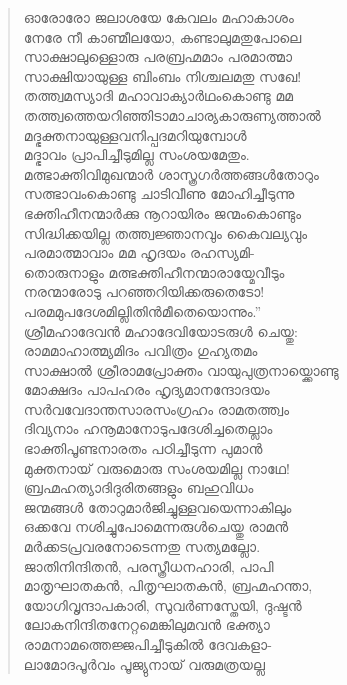 \begin{verse}
ഓരോരോ ജലാശയേ കേവലം മഹാകാശം\\
നേരേ നീ കാണ്മീലയോ, കണ്ടാലുമതുപോലെ\\
സാക്ഷാലുള്ളൊരു പരബ്രഹ്മമാം പരമാത്മാ\\
സാക്ഷിയായുള്ള ബിംബം നിശ്ചലമതു സഖേ!\\
തത്ത്വമസ്യാദി മഹാവാക്യാര്‍ഥംകൊണ്ടു മമ\\
തത്ത്വത്തെയറിഞ്ഞിടാമാചാര്യകാരുണ്യത്താല്‍\\
മദ്ഭക്തനായുള്ളവനിപ്പദമറിയുമ്പോള്‍\\
മദ്ഭാവം പ്രാപിച്ചീടുമില്ല സംശയമേതും.\\
മത്ഭാക്തിവിമുഖന്മാര്‍ ശാസ്ത്രഗര്‍ത്തങ്ങള്‍തോറും\\
സത്ഭാവംകൊണ്ടു ചാടിവീണു മോഹിച്ചീടുന്നു\\
ഭക്തിഹീനന്മാര്‍ക്കു നൂറായിരം ജന്മംകൊണ്ടും\\
സിദ്ധിക്കയില്ല തത്ത്വജ്ഞാനവും കൈവല്യവും\\
പരമാത്മാവാം മമ ഹൃദയം രഹസ്യമി-\\
തൊരുനാളും മത്ഭക്തിഹീനന്മാരായ്മേവീടും\\
നരന്മാരോടു പറഞ്ഞറിയിക്കരുതെടോ!\\
പരമമുപദേശമില്ലിതിന്‍മീതെയൊന്നും.”\\
ശ്രീമഹാദേവന്‍ മഹാദേവിയോടരുള്‍ ചെയ്തു:\\
രാമമാഹാത്മ്യമിദം പവിത്രം ഗുഹ്യതമം\\
സാക്ഷാല്‍ ശ്രീരാമപ്രോക്തം വായുപുത്രനായ്ക്കൊണ്ടു\\
മോക്ഷദം പാപഹരം ഹൃദ്യമാനന്ദോദയം\\
സര്‍വവേദാന്തസാരസംഗ്രഹം രാമതത്ത്വം\\
ദിവ്യനാം ഹനൂമാനോടുപദേശിച്ചതെല്ലാം\\
ഭാക്തിപൂണ്ടനാരതം പഠിച്ചീടുന്ന പുമാന്‍\\
മുക്തനായ് വരുമൊരു സംശയമില്ല നാഥേ!\\
ബ്രഹ്മഹത്യാദിദുരിതങ്ങളും ബഹുവിധം\\
ജന്മങ്ങള്‍ തോറുമാര്‍ജിച്ചുള്ളവയെന്നാകിലും\\
ഒക്കവേ നശിച്ചുപോമെന്നരുള്‍ചെയ്തു രാമന്‍\\
മര്‍ക്കടപ്രവരനോടെന്നതു സത്യമല്ലോ.\\
ജാതിനിന്ദിതന്‍, പരസ്ത്രീധനഹാരി, പാപി\\
മാതൃഘാതകന്‍, പിതൃഘാതകന്‍, ബ്രഹ്മഹന്താ,\\
യോഗിവൃന്ദാപകാരി, സുവര്‍ണസ്തേയി, ദുഷ്ടന്‍\\
ലോകനിന്ദിതനേറ്റമെങ്കിലുമവന്‍ ഭക്ത്യാ\\
രാമനാമത്തെജ്ജപിച്ചീടുകില്‍ ദേവകളാ-\\
ലാമോദപൂര്‍വം പൂജ്യുനായ് വരുമത്രയല്ല\\

\end{verse}
